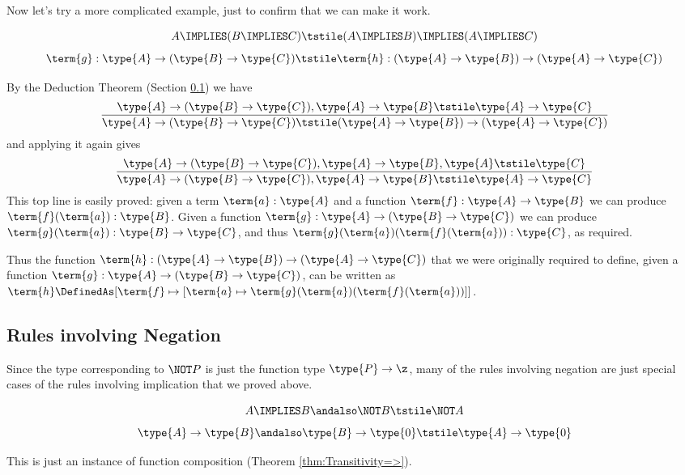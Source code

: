 Now let's try a more complicated example, just to confirm that we can make it work.
\begin{Theorem}
\[
A \IMPLIES (B \IMPLIES C)
\tstile
(A \IMPLIES B) \IMPLIES (A \IMPLIES C)
\]
\[
\term{g}: \type{A} \to (\type{B} \to \type{C})
\tstile
\term{h}: (\type{A} \to \type{B}) \to (\type{A} \to \type{C})
\]
\end{Theorem}
\begin{Proof}
By the Deduction Theorem (Section \ref{}) we have
\[
\frac{
\type{A} \to (\type{B} \to \type{C}), \type{A} \to \type{B}
\tstile
\type{A} \to \type{C}
}{
\type{A} \to (\type{B} \to \type{C})
\tstile
(\type{A} \to \type{B}) \to (\type{A} \to \type{C})
}
\]
and applying it again gives
\[
\frac{
\type{A} \to (\type{B} \to \type{C}), \type{A} \to \type{B}, \type{A}
\tstile
\type{C}
}{
\type{A} \to (\type{B} \to \type{C}), \type{A} \to \type{B}
\tstile
\type{A} \to \type{C}
}
\]
This top line is easily proved: given a term $\term{a}:\type{A}$ and a function $\term{f}: \type{A} \to \type{B}$ we can produce $\term{f}(\term{a}):\type{B}$.  Given a function 
$\term{g}:\type{A} \to (\type{B} \to \type{C})$ we can produce 
$\term{g}(\term{a}):\type{B} \to \type{C}$, and thus 
$\term{g}(\term{a})(\term{f}(\term{a})):\type{C}$, as required.

Thus the function 
$\term{h}: (\type{A} \to \type{B}) \to (\type{A} \to \type{C})$
that we were originally required to define, given a function
$\term{g}: \type{A} \to (\type{B} \to \type{C})$, can be written as
$
\term{h} 
\DefinedAs 
[\term{f} \mapsto [\term{a} \mapsto \term{g}(\term{a})(\term{f}(\term{a}))]]
$.
\end{Proof}


\subsection{Rules involving Negation}


Since the type corresponding to  $\NOT P$ is just the function type $\type{P} \to \z$, many of the rules involving negation are just special cases of the rules involving implication that we proved above.

\begin{Theorem}
\label{sec:DoingLogic-ModusTollens}
\[
A \IMPLIES B\andalso
\NOT B
\tstile
\NOT A
\]
\[
\type{A} \to \type{B}\andalso
\type{B} \to \type{0}
\tstile
\type{A} \to \type{0}
\]
\end{Theorem}
\begin{Proof}
This is just an instance of function composition (Theorem \ref{thm:Transitivity=>}).
\end{Proof}


